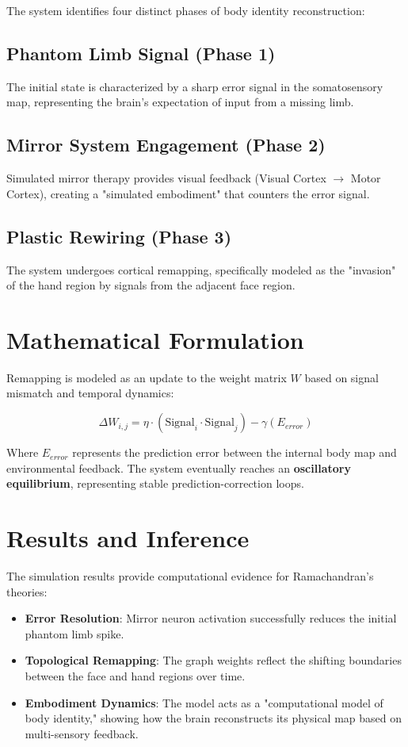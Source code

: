 \documentclass[12pt]{article}
\begin{document}
The system identifies four distinct phases of body identity reconstruction:

\subsection{Phantom Limb Signal (Phase 1)}
The initial state is characterized by a sharp error signal in the somatosensory map, representing the brain's expectation of input from a missing limb.

\subsection{Mirror System Engagement (Phase 2)}
Simulated mirror therapy provides visual feedback (Visual Cortex $\rightarrow$ Motor Cortex), creating a "simulated embodiment" that counters the error signal.

\subsection{Plastic Rewiring (Phase 3)}
The system undergoes cortical remapping, specifically modeled as the "invasion" of the hand region by signals from the adjacent face region.

\section{Mathematical Formulation}

Remapping is modeled as an update to the weight matrix $W$ based on signal mismatch and temporal dynamics:

\[
\Delta W_{i,j} = \eta \cdot (\text{Signal}_i \cdot \text{Signal}_j) - \gamma(E_{error})
\]

Where $E_{error}$ represents the prediction error between the internal body map and environmental feedback. The system eventually reaches an \textbf{oscillatory equilibrium}, representing stable prediction-correction loops.

\section{Results and Inference}

The simulation results provide computational evidence for Ramachandran's theories:
\begin{itemize}
\item \textbf{Error Resolution}: Mirror neuron activation successfully reduces the initial phantom limb spike.
\item \textbf{Topological Remapping}: The graph weights reflect the shifting boundaries between the face and hand regions over time.
\item \textbf{Embodiment Dynamics}: The model acts as a "computational model of body identity," showing how the brain reconstructs its physical map based on multi-sensory feedback.
\end{itemize}
\end{document}
